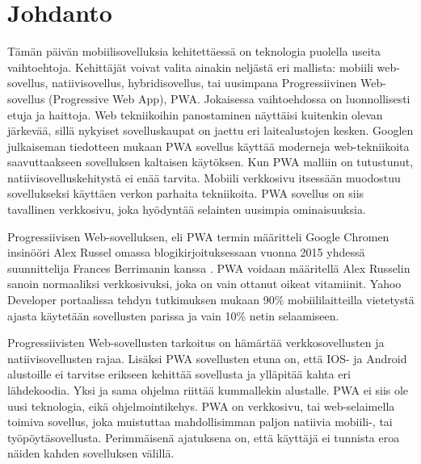 \documentclass{tktltiki}
\begin{document}
\mytableofcontents

\section{Johdanto}

Tämän päivän mobiilisovelluksia kehitettäessä on teknologia puolella useita vaihtoehtoja. Kehittäjät voivat valita ainakin neljästä eri mallista: mobiili web-sovellus, natiivisovellus, hybridisovellus, tai uusimpana Progressiivinen Web-sovellus (Progressive Web App), PWA. Jokaisessa vaihtoehdossa on luonnollisesti etuja ja haittoja. Web tekniikoihin panostaminen näyttäisi kuitenkin olevan järkevää, sillä nykyiset sovelluskaupat on jaettu eri laitealustojen kesken. Googlen julkaiseman tiedotteen mukaan \cite{Gambhir} PWA sovellus käyttää moderneja web-tekniikoita saavuttaakseen sovelluksen kaltaisen käytöksen. Kun PWA malliin on tutustunut, natiivisovelluskehitystä ei enää tarvita. Mobiili verkkosivu itsessään muodostuu sovellukseksi käyttäen verkon parhaita tekniikoita. PWA sovellus on siis tavallinen verkkosivu, joka hyödyntää selainten uusimpia ominaisuuksia.

Progressiivisen Web-sovelluksen, eli PWA termin määritteli Google Chromen insinööri Alex Russel \cite{Russell} \cite{biorn2017progressive} omassa blogikirjoituksessaan vuonna 2015 yhdessä suunnittelija Frances Berrimanin kanssa \cite{tandelimpact}. PWA voidaan määritellä Alex Russelin sanoin normaaliksi verkkosivuksi, joka on vain ottanut oikeat vitamiinit. Yahoo Developer portaalissa tehdyn tutkimuksen mukaan \cite{Khalaf} 90\% mobiililaitteilla vietetystä ajasta käytetään sovellusten parissa ja vain 10\% netin selaamiseen. 

Progressiivisten Web-sovellusten tarkoitus on hämärtää verkkosovellusten ja natiivisovellusten rajaa. Lisäksi PWA sovellusten etuna on, että IOS- ja Android alustoille ei tarvitse erikseen kehittää sovellusta ja ylläpitää kahta eri lähdekoodia. Yksi ja sama ohjelma riittää kummallekin alustalle. PWA ei siis ole uusi teknologia, eikä ohjelmointikehys. PWA on verkkosivu, tai web-selaimella toimiva sovellus, joka muistuttaa mahdollisimman paljon natiivia mobiili-, tai työpöytäsovellusta. Perimmäisenä ajatuksena on, että käyttäjä ei tunnista eroa näiden kahden sovelluksen välillä.
\end{document}
